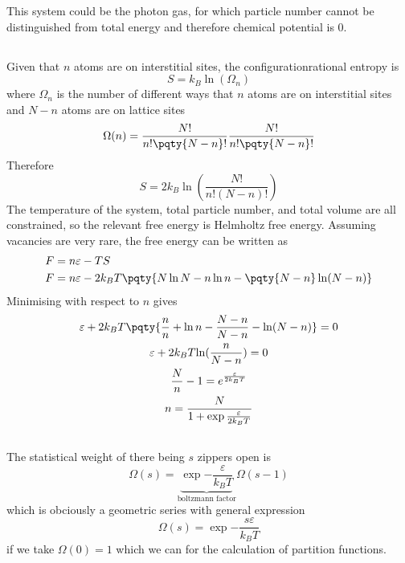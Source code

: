 \documentclass[12pt]{article}
\begin{document}
        This system could be the photon gas, for which particle number cannot be distinguished from total energy and therefore chemical potential is 0.
        \subsection{} Given that \(n\) atoms are on interstitial sites, the configurationrational entropy is \[
            S = k_B \ln(\Omega_n)
        \]
        where \(\Omega_n\) is the number of different ways that \(n\) atoms are on interstitial sites and \(N - n\) atoms are on lattice sites \[
            \Omega(n) = \dfrac{N!}{n!\pqty{N - n}!} \dfrac{N!}{n!\pqty{N - n}!}
        \]
        Therefore \[
            S = 2k_B\ln(\frac{N!}{n!(N - n)!})
         \]
        The temperature of the system, total particle number, and total volume are all constrained, so the relevant free energy is Helmholtz free energy. Assuming vacancies are very rare, the free energy can be written as \begin{align*}
            F &= n \varepsilon - TS\\
            F &= n \varepsilon - 2k_BT \pqty{N\ln N - n\ln n - \pqty{N - n}\ln(N - n)}
        \end{align*}
        Minimising with respect to \(n\) gives
        \begin{gather*}
            \varepsilon + 2k_BT\pqty{\frac{n}{n} + \ln n - \frac{N - n}{N - n} - \ln(N - n)} = 0\\
            \varepsilon + 2k_BT{ \ln(\frac{n}{N - n})} = 0\\
            \frac{N}{n} - 1 = e^{\frac{\varepsilon}{2k_BT}}\\
            n = \frac{N}{1 + \exp{\frac{\varepsilon}{2k_BT}}}
        \end{gather*}
        \subsection{} \subsubsection{} The statistical weight of there being \(s\) zippers open is \[
            \Omega (s) = \underbrace{\exp{ -\frac{\varepsilon}{k_BT}}}_\text{boltzmann factor} \Omega(s - 1)
        \] which is obciously a geometric series with general expression \[
            \Omega (s) = \exp{ - \frac{s\varepsilon}{k_BT}}
        \]
        if we take \(\Omega (0) = 1\) which we can for the calculation of partition functions.
\end{document}
